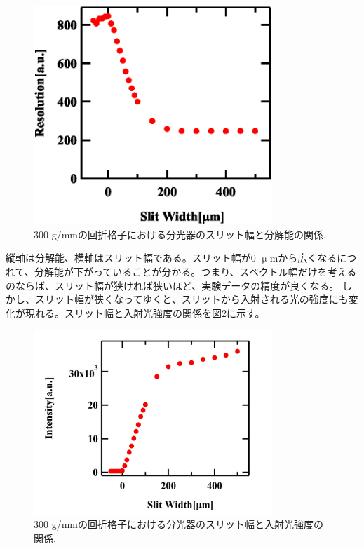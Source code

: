 \documentclass[11pt,a4j]{jsarticle}
\begin{document}
\begin{enumerate}
       \begin{figure}[ht]
        \centering
        \includegraphics[clip,width=9cm]{start1_300Resolution.eps}
        \caption{300 g/mmの回折格子における分光器のスリット幅と分解能の関係.}
        \label{fig_300resolution1}
       \end{figure}

       縦軸は分解能、横軸はスリット幅である。スリット幅が0 $\upmu$mから広くなるにつれて、分解能が下がっていることが分かる。つまり、スペクトル幅だけを考えるのならば、スリット幅が狭ければ狭いほど、実験データの精度が良くなる。
       しかし、スリット幅が狭くなってゆくと、スリットから入射される光の強度にも変化が現れる。スリット幅と入射光強度の関係を図\ref{fig_300Int1}に示す。

       \newpage
       \begin{figure}[ht]
        \centering
        \includegraphics[clip,width=9cm]{start1_300Int.jpg}
        \caption{300 g/mmの回折格子における分光器のスリット幅と入射光強度の関係.}
        \label{fig_300Int1}
       \end{figure}



\end{enumerate}
\end{document}
